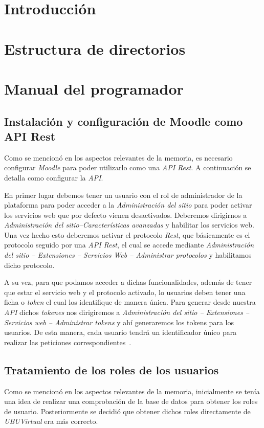 
\section{Introducción}

\section{Estructura de directorios}

\section{Manual del programador}\label{sec:manual-programador}

\subsection{Instalación y configuración de Moodle como API Rest}
Como se mencionó en los aspectos relevantes de la memoria, es necesario configurar \textit{Moodle} para poder utilizarlo como una \textit{API Rest}. A continuación se detalla como configurar la \textit{API}.

En primer lugar debemos tener un usuario con el rol de administrador de la plataforma para poder acceder a la \textit{Administración del sitio} para poder activar los servicios web que por defecto vienen desactivados. Deberemos dirigirnos a \textit{Administración del sitio--Características avanzadas} y habilitar los servicios web. Una vez hecho esto deberemos activar el protocolo \textit{Rest}, que básicamente es el protocolo seguido por una \textit{API Rest}, el cual se accede mediante \textit{Administración del sitio -- Extensiones -- Servicios Web -- Administrar protocolos} y habilitamos dicho protocolo.

A su vez, para que podamos acceder a dichas funcionalidades, además de tener que estar el servicio web y el protocolo activado, lo usuarios deben tener una ficha o \textit{token} el cual los identifique de manera única. Para generar desde nuestra \textit{API} dichos \textit{tokenes} nos dirigiremos a \textit{Administración del sitio -- Extensiones -- Servicios web -- Administrar tokens} y ahí generaremos los tokens para los usuarios. De esta manera, cada usuario tendrá un identificador único para realizar las peticiones correspondientes~\cite{moodle:api-rest-config}.

\subsection{Tratamiento de los roles de los usuarios}
Como se mencionó en los aspectos relevantes de la memoria, inicialmente se tenía una idea de realizar una comprobación de la base de datos para obtener los roles de usuario. Posteriormente se decidió que obtener dichos roles directamente de \textit{UBUVirtual} era más correcto.

